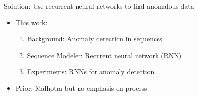 \documentclass{beamer}
\begin{document}
  \begin{frame}{Solution: Use recurrent neural networks to find anomalous data}

    \begin{itemize}
      \item This work:
    \begin{enumerate}
      \item Background: Anomaly detection in sequences
      \item Sequence Modeler: Recurent neural network (RNN)
      \item Experiments: RNNs for anomaly detection
    \end{enumerate}

    \item Prior: Malhotra  but no emphasis on process
    \end{itemize}

  \end{frame}


\end{document}
